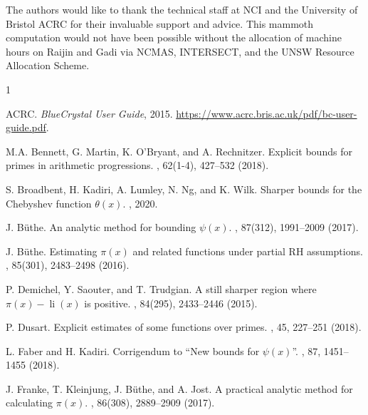 \documentclass[12pt]{article}
\DeclareMathOperator{\li}{li}
\begin{document}
The authors would like to thank the technical staff at NCI and the University of Bristol ACRC for their invaluable support and advice. This mammoth computation would not have been possible without the allocation of machine hours on Raijin and Gadi via NCMAS, INTERSECT, and the UNSW Resource Allocation Scheme.


\begin{thebibliography}{1}

ACRC.
\newblock \emph{{BlueCrystal User Guide}}, 2015.
\newblock \url{https://www.acrc.bris.ac.uk/pdf/bc-user-guide.pdf}.



M.A. Bennett, G. Martin, K. O'Bryant, and A. Rechnitzer.
\newblock Explicit bounds for primes in arithmetic progressions.
, 62(1-4), 427--532  (2018).

S. Broadbent, H. Kadiri, A. Lumley, N. Ng, and K. Wilk.
\newblock Sharper bounds for the Chebyshev function $\theta(x)$.
, 2020.


J. B\"{u}the.
\newblock An analytic method for bounding $\psi(x)$.
, 87(312),  1991--2009 (2017).

J. B\"{u}the.
\newblock Estimating $\pi(x)$ and related functions under partial RH assumptions.
, 85(301),  2483--2498 (2016).

P. Demichel, Y. Saouter, and T. Trudgian.
\newblock A still sharper region where $\pi(x) - \li(x)$ is positive.
, 84(295), 2433--2446 (2015).

P. Dusart.
\newblock Explicit estimates of some functions over primes.
, 45, 227--251 (2018).



L. Faber and H. Kadiri. 
\newblock Corrigendum to ``New bounds for $\psi(x)$''.
, 87, 1451--1455 (2018). 

J. Franke, T. Kleinjung, J. B\"{u}the, and A. Jost.
\newblock A practical analytic method for calculating $\pi(x)$.
, 86(308), 2889--2909 (2017).


\end{thebibliography}
\end{document}
